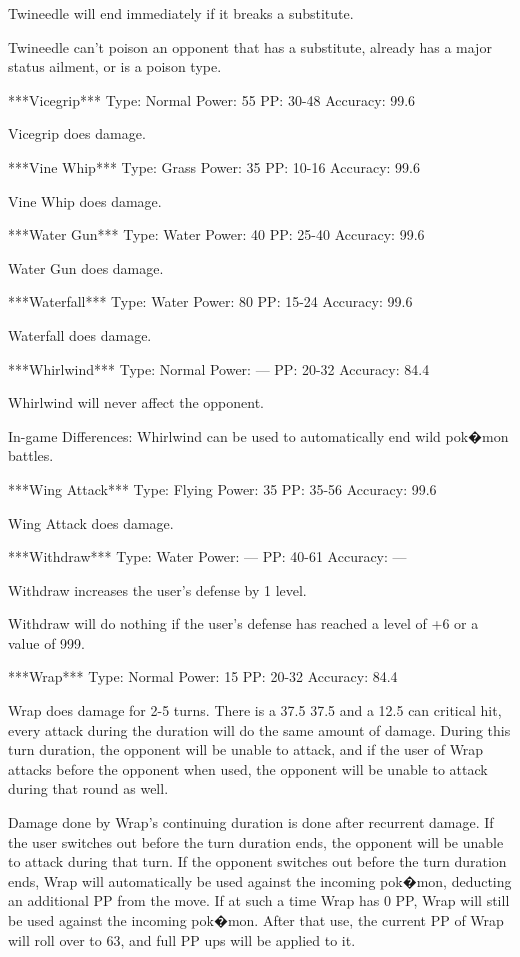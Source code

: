 \documentclass[reprint, aps, prl, paper=A4]{revtex4-1}
\begin{document}
Twineedle will end immediately if it breaks a substitute.

Twineedle can't poison an opponent that has a substitute, already has a major status ailment,
or is a poison type.


***Vicegrip***
Type: Normal
Power: 55
PP: 30-48
Accuracy: 99.6%

Vicegrip does damage.


***Vine Whip***
Type: Grass
Power: 35
PP: 10-16
Accuracy: 99.6%

Vine Whip does damage.


***Water Gun***
Type: Water
Power: 40
PP: 25-40
Accuracy: 99.6%

Water Gun does damage.


***Waterfall***
Type: Water
Power: 80
PP: 15-24
Accuracy: 99.6%

Waterfall does damage.


***Whirlwind***
Type: Normal
Power: ---
PP: 20-32
Accuracy: 84.4%

Whirlwind will never affect the opponent.

In-game Differences:
Whirlwind can be used to automatically end wild pok�mon battles.


***Wing Attack***
Type: Flying
Power: 35
PP: 35-56
Accuracy: 99.6%

Wing Attack does damage.


***Withdraw***
Type: Water
Power: ---
PP: 40-61
Accuracy: ---

Withdraw increases the user's defense by 1 level.

Withdraw will do nothing if the user's defense has reached a level of +6 or a value of 999.


***Wrap***
Type: Normal
Power: 15
PP: 20-32
Accuracy: 84.4%

Wrap does damage for 2-5 turns. There is a 37.5%
37.5%
and a 12.5%
can critical hit, every attack during the duration will do the same amount of damage. During
this turn duration, the opponent will be unable to attack, and if the user of Wrap attacks
before the opponent when used, the opponent will be unable to attack during that round as well.

Damage done by Wrap's continuing duration is done after recurrent damage. If the user switches
out before the turn duration ends, the opponent will be unable to attack during that turn. If
the opponent switches out before the turn duration ends, Wrap will automatically be used
against the incoming pok�mon, deducting an additional PP from the move. If at such a time Wrap
has 0 PP, Wrap will still be used against the incoming pok�mon. After that use, the current PP
of Wrap will roll over to 63, and full PP ups will be applied to it.
\end{document}
